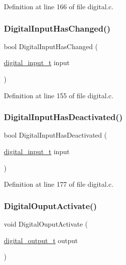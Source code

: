 Definition at line 166 of file digital.\+c.

\mbox{\label{group__hal_gae975bb8941430b6bb04bd11b7714bed5}} 
\subsubsection{\texorpdfstring{Digital\+Input\+Has\+Changed()}{DigitalInputHasChanged()}}
{\footnotesize\ttfamily bool Digital\+Input\+Has\+Changed (\begin{DoxyParamCaption}\item[{\hyperlink{group__hal_gaa88780f43e331bbd1d6069d75ad68fcf}{digital\+\_\+input\+\_\+t}}]{input }\end{DoxyParamCaption})}



Definition at line 155 of file digital.\+c.

\mbox{\label{group__hal_gac75e3db7f366d04bbdaa6589a92d580c}} 
\subsubsection{\texorpdfstring{Digital\+Input\+Has\+Deactivated()}{DigitalInputHasDeactivated()}}
{\footnotesize\ttfamily bool Digital\+Input\+Has\+Deactivated (\begin{DoxyParamCaption}\item[{\hyperlink{group__hal_gaa88780f43e331bbd1d6069d75ad68fcf}{digital\+\_\+input\+\_\+t}}]{input }\end{DoxyParamCaption})}



Definition at line 177 of file digital.\+c.

\mbox{\label{group__hal_gab19a43c015776dc20c406c14e0d3d481}} 
\subsubsection{\texorpdfstring{Digital\+Ouput\+Activate()}{DigitalOuputActivate()}}
{\footnotesize\ttfamily void Digital\+Ouput\+Activate (\begin{DoxyParamCaption}\item[{\hyperlink{group___plantilla_ga3e63b19d3d0dbfbfb2c50b3ac1f69aa0}{digital\+\_\+output\+\_\+t}}]{output }\end{DoxyParamCaption})}


